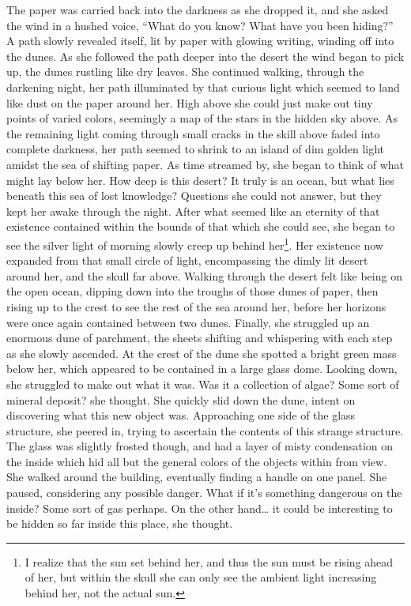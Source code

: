 \documentclass[12pt]{article}
\begin{document}
\begin{flushleft}
The paper was carried back into the darkness as she dropped it, and she asked the wind in a hushed voice, “What do you know? What have you been hiding?” 
A path slowly revealed itself, lit by paper with glowing writing, winding off into the dunes. As she followed the path deeper into the desert the wind began to pick up, the dunes rustling like dry leaves. 
She continued walking, through the darkening night, her path illuminated by that curious light which seemed to land like dust on the paper around her. High above she could just make out tiny points of varied colors, seemingly a map of the stars in the hidden sky above. As the remaining light coming through small cracks in the skill above faded into complete darkness, her path seemed to shrink to an island of dim golden light amidst the sea of shifting paper. As time streamed by, she began to think of what might lay below her. How deep is this desert? It truly is an ocean, but what lies beneath this sea of lost knowledge? Questions she could not answer, but they kept her awake through the night.
After what seemed like an eternity of that existence contained within the bounds of that which she could see, she began to see the silver light of morning slowly creep up behind her\footnote{I realize that the sun set behind her, and thus the sun must be rising ahead of her, but within the skull she can only see the ambient light increasing behind her, not the actual sun.}. Her existence now expanded from that small circle of light, encompassing the dimly lit desert around her, and the skull far above. Walking through the desert felt like being on the open ocean, dipping down into the troughs of those dunes of paper, then rising up to the crest to see the rest of the sea around her, before her horizons were once again contained between two dunes. 
Finally, she struggled up an enormous dune of parchment, the sheets shifting and whispering with each step as she slowly ascended. At the crest of the dune she spotted a bright green mass below her, which appeared to be contained in a large glass dome. Looking down, she struggled to make out what it was. Was it a collection of algae? Some sort of mineral deposit? she thought. She quickly slid down the dune, intent on discovering what this new object was. Approaching one side of the glass structure, she peered in, trying to ascertain the contents of this strange structure. The glass was slightly frosted though, and had a layer of misty condensation on the inside which hid all but the general colors of the objects within from view. She walked around the building, eventually finding a handle on one panel. She paused, considering any possible danger. What if it’s something dangerous on the inside? Some sort of gas perhaps. On the other hand…    it could be interesting to be hidden so far inside this place, she thought. 

\end{flushleft}
\end{document}
